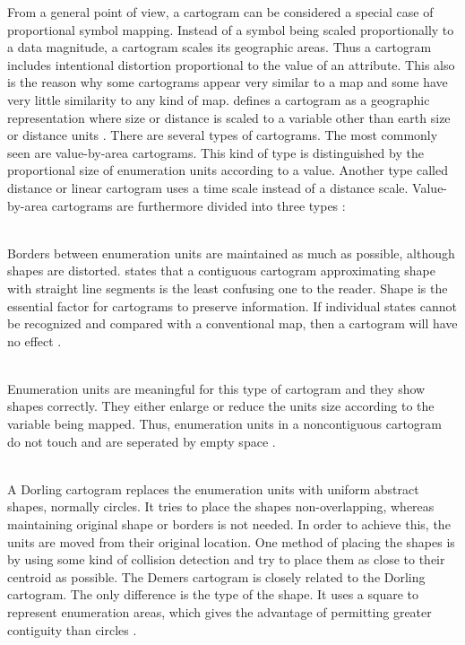 From a general point of view, a cartogram can be considered a special case of proportional symbol mapping. Instead of a symbol being scaled proportionally to a data magnitude, a cartogram scales its geographic areas. Thus a cartogram includes intentional distortion proportional to the value of an attribute. This also is the reason why some cartograms appear very similar to a map and some have very little similarity to any kind of map. \citeauthor{Tyner2010} defines a cartogram as a geographic representation where size or distance is scaled to a variable other than earth size or distance units .
There are several types of cartograms. The most commonly seen are value-by-area cartograms. This kind of type is distinguished by the proportional size of enumeration units according to a value. Another type called distance or linear cartogram uses a time scale instead of a distance scale. Value-by-area cartograms are furthermore divided into three types :

\begin{enumerate}

 \hfill \\
Borders between enumeration units are maintained as much as possible, although shapes are distorted. \citeauthor{Tyner2010} states that a contiguous cartogram approximating shape with straight line segments is the least confusing one to the reader. Shape is the essential factor for cartograms to preserve information. If individual states cannot be recognized and compared with a conventional map, then a cartogram will have no effect .

 \hfill \\
Enumeration units are meaningful for this type of cartogram and they show shapes correctly. They either enlarge or reduce the units size according to the variable being mapped. Thus, enumeration units in a noncontiguous cartogram do not touch and are seperated by empty space .

 \hfill \\
A Dorling cartogram replaces the enumeration units with uniform abstract shapes, normally circles. It tries to place the shapes non-overlapping, whereas maintaining original shape or borders is not needed. In order to achieve this, the units are moved from their original location. One method of placing the shapes is by using some kind of collision detection and try to place them as close to their centroid as possible. The Demers cartogram is closely related to the Dorling cartogram. The only difference is the type of the shape. It uses a square to represent enumeration areas, which gives the advantage of permitting greater contiguity than circles .

\end{enumerate}

